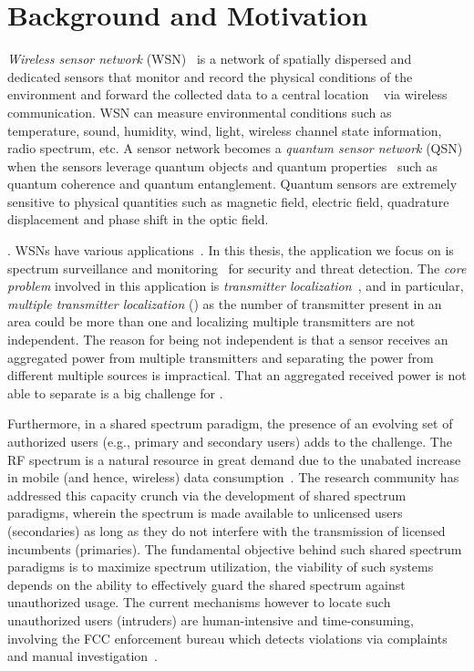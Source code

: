\section{Background and Motivation}

\emph{Wireless sensor network} (WSN)~\cite{wsn_survey} is a network of spatially dispersed and dedicated sensors that monitor and record the 
physical conditions of the environment and forward the collected data to a central location ~\cite{wsn_wiki} via wireless communication.
WSN can measure environmental conditions such as temperature, sound, humidity, wind, light, wireless channel state information, radio spectrum, etc.
A sensor network becomes a \emph{quantum sensor network} (QSN) when the sensors leverage quantum objects and quantum properties~\cite{RevModPhys.quantumsensing}
such as quantum coherence and quantum entanglement.
Quantum sensors are extremely sensitive to physical quantities such as magnetic field, electric field, quadrature displacement
and phase shift in the optic field.

. WSNs have various applications~\cite{tsn17-water,sensys10-health,mobicom03-sensor}.
In this thesis, the application we focus on is spectrum surveillance and monitoring~\cite{arani2018} for security and threat detection.
The \emph{core problem} involved in this application is \emph{transmitter localization}~\cite{ton-sensorselect,caitao2023qsn},
 and in particular, \emph{multiple transmitter localization} (\mtl) as 
the number of transmitter present in an area could be more than one and localizing multiple transmitters are not independent.
The reason for being not independent is that a sensor receives an aggregated power from multiple transmitters and separating 
the power from different multiple sources is impractical.
That an aggregated received power is not able to separate is a big challenge for \mtl.

Furthermore, in a shared spectrum paradigm, the presence of an evolving set of authorized users 
(e.g., primary and secondary users) adds to the challenge.
The RF spectrum is a natural resource in great demand due to the unabated increase in mobile (and hence, wireless) data consumption~\cite{Jeffrey14}. 
The research community has addressed this capacity crunch via the development of shared spectrum paradigms, wherein the spectrum 
is made available to unlicensed users (secondaries) as long as they do not interfere with the transmission of licensed incumbents (primaries).
The fundamental objective behind such shared spectrum paradigms is to maximize spectrum utilization,
the viability of such systems depends on the ability to effectively guard the shared spectrum against unauthorized usage. 
The current mechanisms however to locate such unauthorized users (intruders) are human-intensive and time-consuming, 
involving the FCC enforcement bureau which detects violations via complaints and manual investigation~\cite{mobicom17-splot}. 

